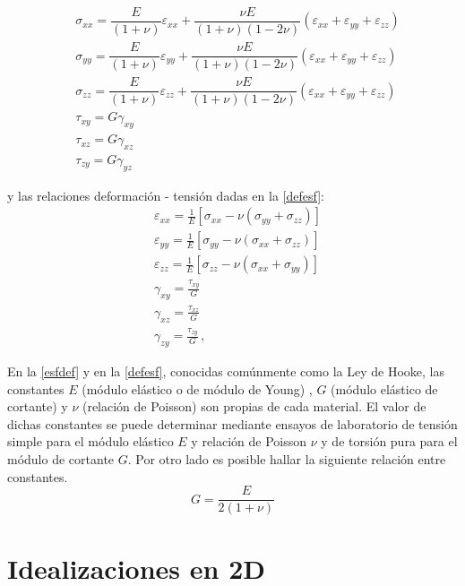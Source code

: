 \documentclass[../notas medios.tex]{subfiles}
\begin{document}
\begin{equation} \label{esfdef}
\begin{split}
& \sigma_{xx} = \dfrac{E}{(1 + \nu)} \varepsilon_{xx} + \dfrac{\nu E}{(1 + \nu)(1-2 \nu)} (\varepsilon_{xx} + \varepsilon_{yy} + \varepsilon_{zz}) \\
& \sigma_{yy} =\dfrac{E}{(1 + \nu)} \varepsilon_{yy} + \dfrac{\nu E}{(1 + \nu)(1-2 \nu)} (\varepsilon_{xx} + \varepsilon_{yy} + \varepsilon_{zz}) \\
& \sigma _{zz} = \dfrac{E}{(1 + \nu)} \varepsilon_{zz} + \dfrac{\nu E}{(1 + \nu)(1-2 \nu)} (\varepsilon_{xx} + \varepsilon_{yy} + \varepsilon_{zz}) \\
& \tau_{xy} = G \gamma_{xy}  \\
& \tau_{xz} = G \gamma_{xz}  \\
& \tau_{zy} = G \gamma_{yz}
\end{split}
\end{equation}

y  las relaciones deformación - tensión dadas en la \cref{defesf}:
\begin{equation} \label{defesf}
\begin{split}
& \varepsilon_{xx} = \frac{1}{E}\left[ \sigma_{xx} - \nu (\sigma_{yy} + \sigma_{zz})\right] \\
& \varepsilon_{yy} = \frac{1}{E}\left[ \sigma_{yy} - \nu (\sigma_{xx} + \sigma_{zz}) \right] \\
& \varepsilon_{zz} = \frac{1}{E}\left[ \sigma_{zz} - \nu (\sigma_{xx} + \sigma_{yy}) \right] \\
& \gamma_{xy} = \frac{\tau_{xy}}{G} \\
& \gamma_{xz} = \frac{\tau_{xz}}{G} \\
& \gamma_{zy} = \frac{\tau_{zy}}{G}\, ,
\end{split}
\end{equation}

En la \cref{esfdef} y en la \cref{defesf}, conocidas comúnmente como la Ley de Hooke, las constantes $E$ (módulo elástico o de módulo de Young) , $G$ (módulo elástico de cortante) y $\nu$ (relación de Poisson) son propias de cada material. El valor de dichas constantes se puede determinar mediante ensayos de laboratorio de tensión simple para el módulo elástico $E$ y relación de Poisson $\nu$ y de torsión pura para el módulo de cortante $G$. Por otro lado es posible hallar la siguiente relación entre constantes.
\[G = \dfrac{E}{2(1 + \nu)}\]

\section{Idealizaciones en 2D}
\end{document}
